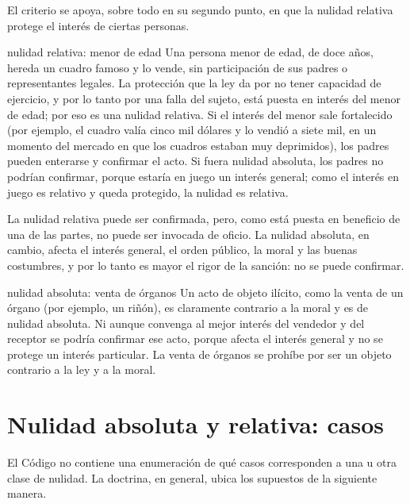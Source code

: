 \documentclass[12pt,oneside]{book}
\begin{document}
El criterio se apoya, sobre todo en su segundo punto, en que la nulidad relativa protege el interés de ciertas personas.

\begin{example}{nulidad relativa: menor de edad}
Una persona menor de edad, de doce años, hereda un cuadro famoso y lo vende, sin participación de sus padres o representantes legales. La protección que la ley da por no tener capacidad de ejercicio, y por lo tanto por una falla del sujeto, está puesta en interés del menor de edad; por eso es una nulidad relativa. Si el interés del menor sale fortalecido (por ejemplo, el cuadro valía cinco mil dólares y lo vendió a siete mil, en un momento del mercado en que los cuadros estaban muy deprimidos), los padres pueden enterarse y confirmar el acto. Si fuera nulidad absoluta, los padres no podrían confirmar, porque estaría en juego un interés general; como el interés en juego es relativo y queda protegido, la nulidad es relativa.
\end{example}

La nulidad relativa puede ser confirmada, pero, como está puesta en beneficio de una de las partes, no puede ser invocada de oficio. La nulidad absoluta, en cambio, afecta el interés general, el orden público, la moral y las buenas costumbres, y por lo tanto es mayor el rigor de la sanción: no se puede confirmar.

\begin{example}{nulidad absoluta: venta de órganos}
Un acto de objeto ilícito, como la venta de un órgano (por ejemplo, un riñón), es claramente contrario a la moral y es de nulidad absoluta. Ni aunque convenga al mejor interés del vendedor y del receptor se podría confirmar ese acto, porque afecta el interés general y no se protege un interés particular. La venta de órganos se prohíbe por ser un objeto contrario a la ley y a la moral.
\end{example}

\section{Nulidad absoluta y relativa: casos}

El Código no contiene una enumeración de qué casos corresponden a una u otra clase de nulidad. La doctrina, en general, ubica los supuestos de la siguiente manera.
\end{document}
